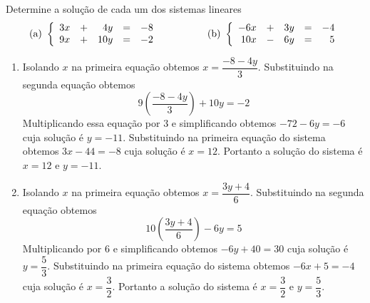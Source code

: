 
\newcommand{\R}{\mathbb{R}}

\begin{problem}
Determine a solução de cada um dos sistemas lineares
$$\text{(a)}\ \left\{ \begin{array}{rrrrr}
 3x & + &  4y &   = & -8 \\
 9x & + & 10y &   = & -2 \end{array} \right. \ \ \ \ \ \ \ \ \ \ \ \ \ \ \ \\
	\text{(b)}\ \left\{ \begin{array}{rrrrr}
-6x & + &  3y &   = & -4 \\
10x & - &  6y &   = &  5 \end{array} \right.$$
\end{problem}
\begin{solution}
\begin{enumerate}
\item[(a)] Isolando $x$ na primeira equação obtemos $x = \dfrac{-8-4y}{3}$. Substituindo na segunda equação obtemos
$$9 \left( \dfrac{-8-4y}{3}\right) + 10y = -2$$
Multiplicando essa equação por $3$ e simplificando obtemos $-72-6y=-6$ cuja solução é $y=-11$. Substituindo na primeira equação do sistema obtemos $3x-44=-8$ cuja solução é $x=12$. Portanto a solução do sistema é $x=12$ e $y=-11$.
\item[(b)] Isolando $x$ na primeira equação obtemos $x = \dfrac{3y+4}{6}$. Substituindo na segunda equação obtemos
$$10 \left( \dfrac{3y+4}{6}\right) - 6y = 5$$
Multiplicando por $6$ e simplificando obtemos $-6y+40=30$ cuja solução é $y=\dfrac{5}{3}$.
Substituindo na primeira equação do sistema obtemos $-6x+5=-4$ cuja solução é $x=\dfrac{3}{2}$.
Portanto a solução do sistema é $x=\dfrac{3}{2}$ e $y=\dfrac{5}{3}$.
\end{enumerate}
\end{solution}



